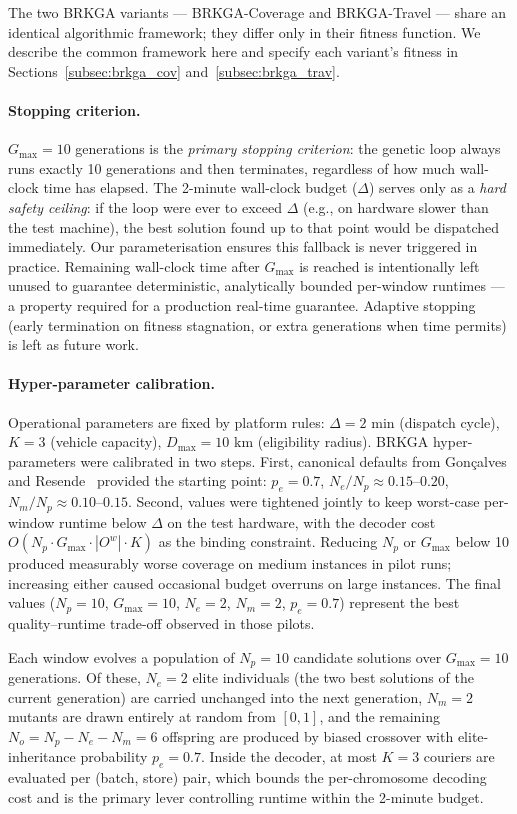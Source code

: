 The two BRKGA variants — BRKGA-Coverage and BRKGA-Travel —
share an identical algorithmic framework;
they differ only in their fitness function.
We describe the common framework here and specify each variant's
fitness in Sections~\ref{subsec:brkga_cov} and~\ref{subsec:brkga_trav}.

\paragraph{Stopping criterion.}
$G_{\max} = 10$ generations is the \emph{primary stopping criterion}:
the genetic loop always runs exactly 10 generations and then
terminates, regardless of how much wall-clock time has elapsed.
The 2-minute wall-clock budget ($\Delta$) serves only as a
\emph{hard safety ceiling}: if the loop were ever to exceed
$\Delta$ (e.g., on hardware slower than the test machine),
the best solution found up to that point would be dispatched
immediately. Our parameterisation ensures this fallback is
never triggered in practice.
Remaining wall-clock time after $G_{\max}$ is reached is
intentionally left unused to guarantee deterministic,
analytically bounded per-window runtimes — a property
required for a production real-time guarantee.
Adaptive stopping (early termination on fitness stagnation,
or extra generations when time permits) is left as future work.

\paragraph{Hyper-parameter calibration.}
Operational parameters are fixed by platform rules:
$\Delta = 2$ min (dispatch cycle), $K = 3$ (vehicle capacity),
$D_{\max} = 10$ km (eligibility radius).
BRKGA hyper-parameters were calibrated in two steps.
First, canonical defaults from Gon\c{c}alves and
Resende~\cite{goncalves2011brkga} provided the starting point:
$p_e = 0.7$, $N_e/N_p \approx 0.15$--$0.20$,
$N_m/N_p \approx 0.10$--$0.15$.
Second, values were tightened jointly to keep worst-case
per-window runtime below $\Delta$ on the test hardware,
with the decoder cost $O(N_p \cdot G_{\max} \cdot |O^w| \cdot K)$
as the binding constraint.
Reducing $N_p$ or $G_{\max}$ below 10 produced measurably worse
coverage on medium instances in pilot runs; increasing either
caused occasional budget overruns on large instances.
The final values ($N_p = 10$, $G_{\max} = 10$, $N_e = 2$,
$N_m = 2$, $p_e = 0.7$) represent the best quality--runtime
trade-off observed in those pilots.

Each window evolves a population of $N_p = 10$ candidate solutions
over $G_{\max} = 10$ generations.
Of these, $N_e = 2$ elite individuals (the two best solutions of the
current generation) are carried unchanged into the next generation,
$N_m = 2$ mutants are drawn entirely at random from $[0,1]$, and
the remaining $N_o = N_p - N_e - N_m = 6$ offspring are produced
by biased crossover with elite-inheritance probability $p_e = 0.7$.
Inside the decoder, at most $K = 3$ couriers are evaluated per
(batch, store) pair, which bounds the per-chromosome decoding cost
and is the primary lever controlling runtime within the 2-minute budget.

